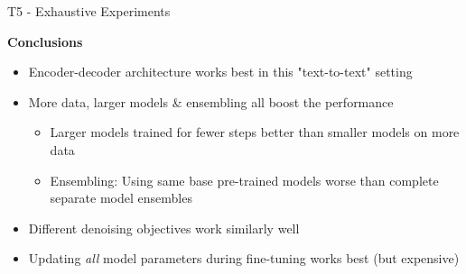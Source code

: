 \begin{frame}{T5 - Exhaustive Experiments}

\vfill
	
	\textbf{Conclusions}
	
	\begin{itemize}
		\item Encoder-decoder architecture works best in this "text-to-text" setting
		\item More data, larger models \& ensembling all boost the performance
			\begin{itemize}
				\item Larger models trained for fewer steps better than smaller models on more data
				\item Ensembling: Using same base pre-trained models worse than complete separate model ensembles
			\end{itemize}
		\item Different denoising objectives work similarly well
		\item Updating \textit{all} model parameters during fine-tuning works best (but expensive)
	\end{itemize}
	
\vfill

\end{frame}


